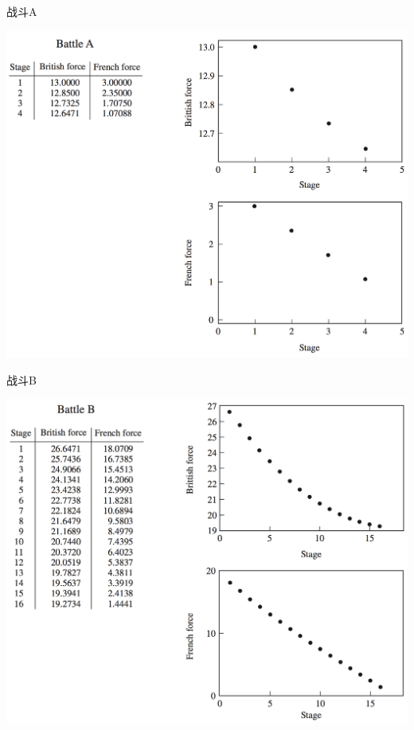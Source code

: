 \documentclass[UTF8, mathserif]{ctexbeamer}
\begin{document}
\begin{frame}{战斗A}
  \begin{center}
    \includegraphics[height=.9\textheight{}]{fight-A.png}
  \end{center}  
\end{frame}

\begin{frame}{战斗B}
  \begin{center}
    \includegraphics[height=.9\textheight{}]{fight-B.png}
  \end{center}  
\end{frame}
\end{document}
